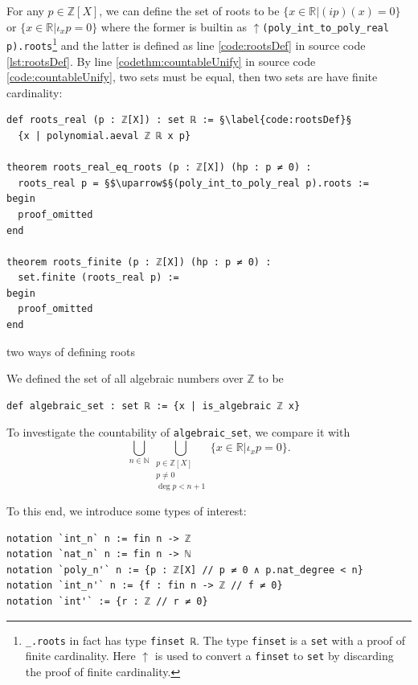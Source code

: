 \documentclass{report}
\theoremstyle{definition}
\newenvironment{code}{\captionsetup{type=listing}}{}
\begin{document}
For any $p\in\mathbb Z[X]$, we can define the set of roots to be $\{x \in\mathbb R | (i p)(x) = 0\}$ or $\{x\in\mathbb R| \iota_x p=0\}$ where the former is builtin as {\tt \small $\uparrow$(poly\_int\_to\_poly\_real p).roots}\footnote{{\tt \small \_.roots} in fact has type {\tt \small finset ℝ}. The type {\tt \small finset} is a {\tt \small set} with a proof of finite cardinality. Here $\uparrow$ is used to convert a {\tt \small finset} to {\tt \small set} by discarding the proof of finite cardinality.} and the latter is defined as line \ref{code:rootsDef} in source code \ref{lst:rootsDef}. By line \ref{codethm:countableUnify} in source code \ref{code:countableUnify}, two sets must be equal, then two sets are have finite cardinality:

\begin{code}
\begin{verbatim}
def roots_real (p : ℤ[X]) : set ℝ := §\label{code:rootsDef}§
  {x | polynomial.aeval ℤ ℝ x p}

theorem roots_real_eq_roots (p : ℤ[X]) (hp : p ≠ 0) : 
  roots_real p = §$\uparrow$§(poly_int_to_poly_real p).roots :=
begin
  proof_omitted
end

theorem roots_finite (p : ℤ[X]) (hp : p ≠ 0) : 
  set.finite (roots_real p) :=
begin
  proof_omitted
end
\end{verbatim}
\caption{two ways of defining roots}
\label{lst:rootsDef}
\end{code}

We defined the set of all algebraic numbers over $\mathbb Z$ to be
\begin{verbatim}
def algebraic_set : set ℝ := {x | is_algebraic ℤ x}
\end{verbatim}
To investigate the countability of {\tt \small algebraic\_set}, we compare it with
\begin{equation}
  \bigcup_{n\in\mathbb N}\bigcup_{\substack{p\in\mathbb{Z}[X]\\ p\ne 0\\ \deg{p}<n+1}} \{x\in\mathbb{R}|\iota_xp=0\}.
  \label{countability:setEq}
\end{equation}


To this end, we introduce some types of interest:
\begin{verbatim}
notation `int_n` n := fin n -> ℤ
notation `nat_n` n := fin n -> ℕ
notation `poly_n'` n := {p : ℤ[X] // p ≠ 0 ∧ p.nat_degree < n}
notation `int_n'` n := {f : fin n -> ℤ // f ≠ 0}
notation `int'` := {r : ℤ // r ≠ 0}
\end{verbatim}
\end{document}
